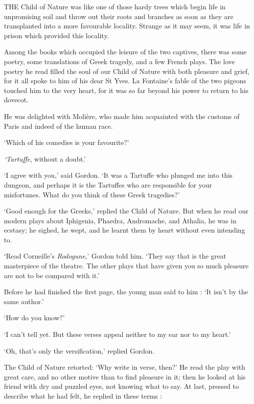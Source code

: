 \documentclass{article}
\begin{document}
\begin{center}
 

THE Child of Nature was like one of those hardy trees which begin life in unpromising 
soil and throw out their roots and branches as soon as they are transplanted into 
a more favourable locality. Strange as it may seem, it was life in prison which 
provided this locality. 

Among the books which occupied the leisure of the two captives, there was some 
poetry, some translations of Greek tragedy, and a few French plays. The love poetry 
he read filled the soul of our Child of Nature with both pleasure and grief, for 
it all spoke to him of his dear St Yves. La Fontaine's fable of the two pigeons 
touched him to the very heart, for it was so far beyond his power to return to 
his dovecot. 

He was delighted with Molière, who made him acquainted with the customs of Paris 
and indeed of the human race. 

`Which of his comedies is your favourite?' 

\textit{`Tartuffe}, without a doubt.' 

`I agree with you,' said Gordon. `It was a Tartuffe who plunged me into this dungeon, 
and perhaps it is the Tartuffes who are responsible for your misfortunes. What 
do you think of these Greek tragedies?' 

`Good enough for the Greeks,' replied the Child of Nature. But when he read our 
modern plays about Iphigenia, Phaedra, Andromache, and Athalia, he was in ecstasy; 
he sighed, he wept, and he learnt them by heart without even intending to. 

`Read Corneille's \textit{Rodogune},' Gordon told him. `They say that is the great 
masterpiece of the theatre. The other plays that have given you so much pleasure 
are not to be compared with it.' 

Before he had finished the first page, the young man said to him : `It isn't by 
the same author.' 

`How do you know?' 

`I can't tell yet. But these verses appeal neither to my ear nor to my heart.' 

`Oh, that's only the versification,' replied Gordon. 

The Child of Nature retorted: `Why write in verse, then?' He read the play with 
great care, and no other motive than to find pleasure in it; then he looked at 
his friend with dry and puzzled eyes, not knowing what to say. At last, pressed 
to describe what he had felt, he replied in these terms : 


\end{center}
\end{document}
